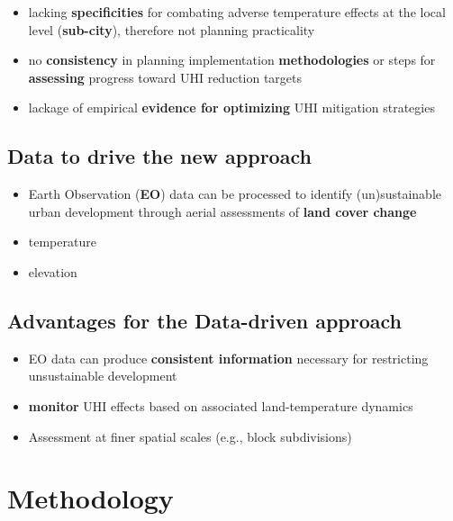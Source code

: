 \documentclass[
  letterpaper,
  DIV=11,
  numbers=noendperiod]{scrreprt}
\providecommand{\tightlist}{%
  \setlength{\itemsep}{0pt}\setlength{\parskip}{0pt}}\usepackage{longtable,booktabs,array}
\begin{document}
\begin{itemize}
\tightlist
\item
  lacking \textbf{specificities} for combating adverse temperature
  effects at the local level (\textbf{sub-city}), therefore not planning
  practicality
\item
  no \textbf{consistency} in planning implementation
  \textbf{methodologies} or steps for \textbf{assessing} progress toward
  UHI reduction targets
\item
  lackage of empirical \textbf{evidence for optimizing} UHI mitigation
  strategies
\end{itemize}

\hypertarget{data-to-drive-the-new-approach}{%
\subsection{Data to drive the new
approach}\label{data-to-drive-the-new-approach}}

\begin{itemize}
\tightlist
\item
  Earth Observation (\textbf{EO}) data can be processed to identify
  (un)sustainable urban development through aerial assessments of
  \textbf{land cover change}
\item
  temperature
\item
  elevation
\end{itemize}

\hypertarget{advantages-for-the-data-driven-approach}{%
\subsection{Advantages for the Data-driven
approach}\label{advantages-for-the-data-driven-approach}}

\begin{itemize}
\tightlist
\item
  EO data can produce \textbf{consistent information} necessary for
  restricting unsustainable development
\item
  \textbf{monitor} UHI effects based on associated land-temperature
  dynamics
\item
  Assessment at finer spatial scales (e.g., block subdivisions)
\end{itemize}

\hypertarget{methodology}{%
\section{Methodology}\label{methodology}}
\end{document}
